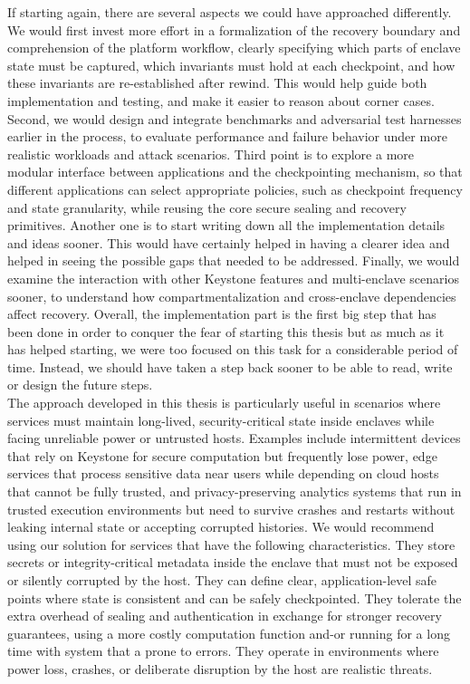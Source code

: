 \documentclass[11pt,a4paper]{report}
\begin{document}
If starting again, there are several aspects we could have approached differently.  
We would first invest more effort in a formalization of the recovery boundary and comprehension of the platform workflow, clearly specifying which parts of enclave state must be captured, which invariants must hold at each checkpoint, and how these invariants are re-established after rewind.  
This would help guide both implementation and testing, and make it easier to reason about corner cases.  
Second, we would design and integrate benchmarks and adversarial test harnesses earlier in the process, to evaluate performance and failure behavior under more realistic workloads and attack scenarios.  
Third point is to explore a more modular interface between applications and the checkpointing mechanism, so that different applications can select appropriate policies, such as checkpoint frequency and state granularity, while reusing the core secure sealing and recovery primitives.  
Another one is to start writing down all the implementation details and ideas sooner. This would have certainly helped in having a clearer idea and helped in seeing the possible gaps that needed to be addressed.  
Finally, we would examine the interaction with other Keystone features and multi-enclave scenarios sooner, to understand how compartmentalization and cross-enclave dependencies affect recovery.  
Overall, the implementation part is the first big step that has been done in order to conquer the fear of starting this thesis but as much as it has helped starting, we were too focused on this task for a considerable period of time. 
Instead, we should have taken a step back sooner to be able to read, write or design the future steps.
\\

The approach developed in this thesis is particularly useful in scenarios where services must maintain long-lived, security-critical state inside enclaves while facing unreliable power or untrusted hosts.  
Examples include intermittent devices that rely on Keystone for secure computation but frequently lose power, edge services that process sensitive data near users while depending on cloud hosts that cannot be fully trusted, and privacy-preserving analytics systems that run in trusted execution environments but need to survive crashes and restarts without leaking internal state or accepting corrupted histories.  
We would recommend using our solution for services that have the following characteristics.  
They store secrets or integrity-critical metadata inside the enclave that must not be exposed or silently corrupted by the host.  
They can define clear, application-level safe points where state is consistent and can be safely checkpointed.  
They tolerate the extra overhead of sealing and authentication in exchange for stronger recovery guarantees, using a more costly computation function and-or running for a long time with system that a prone to errors.  
They operate in environments where power loss, crashes, or deliberate disruption by the host are realistic threats.  
\\
\end{document}

